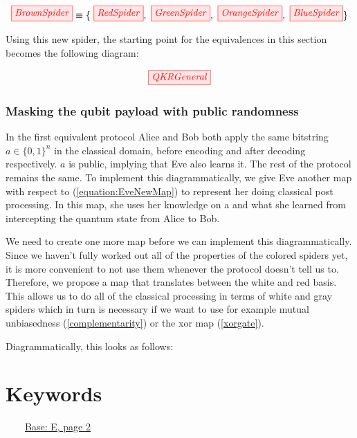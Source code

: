 \documentclass[]{article}
\begin{document}
\begin{equation}
	\tikzfig{BrownSpider} \equiv \{~\tikzfig{RedSpider},~ \tikzfig{GreenSpider},~ \tikzfig{OrangeSpider},~ \tikzfig{BlueSpider}\}
\end{equation}

Using this new spider, the starting point for the equivalences in this section becomes the following diagram:

\begin{equation}
	\tikzfig{QKRGeneral}
\end{equation}


\subsubsection{Masking the qubit payload with public randomness}

In the first equivalent protocol Alice and Bob both apply the same bitstring $a \in \{0,1\}^n$ in the classical domain, before encoding and after decoding respectively. $a$ is public, implying that Eve also learns it. The rest of the protocol remains the same. To implement this diagrammatically, we give Eve another map with respect to (\ref{equation:EveNewMap}) to represent her doing classical post processing. In this map, she uses her knowledge on a and what she learned from intercepting the quantum state from Alice to Bob.

We need to create one more map before we can implement this diagrammatically. Since we haven't fully worked out all of the properties of the colored spiders yet, it is more convenient to not use them whenever the protocol doesn't tell us to. Therefore, we propose a map that translates between the white and red basis. This allows us to do all of the classical processing in terms of white and gray spiders which in turn is necessary if we want to use for example mutual unbiasedness (\ref{complementarity}) or the xor map (\ref{xorgate}).

 Diagrammatically, this looks as follows:






\appendix


\section{Keywords}
\label{Keywords}


~~~~\hyperref[coloursandbases]{Base: E, page 2}
\end{document}
